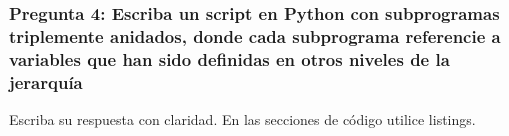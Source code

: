 \subsubsection{Pregunta 4: Escriba un script en Python con subprogramas triplemente anidados, donde cada subprograma referencie a variables que han sido definidas en otros niveles de la jerarquía}

Escriba su respuesta con claridad. En las secciones de código utilice listings.
